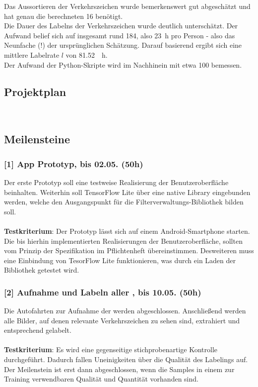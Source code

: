 Das Aussortieren der Verkehrszeichen wurde bemerkenswert gut abgeschätzt und hat genau die berechneten \SI{16}{\PS} benötigt.\\

Die Dauer des Labelns der Verkehrszeichen wurde deutlich unterschätzt. Der Aufwand belief sich auf insgesamt rund \SI{184}{\PS}, also \SI{23}{\hour} pro Person - also das Neunfache (!) der ursprünglichen Schätzung. Darauf basierend ergibt sich eine mittlere Labelrate $l$ von \SI{81.52}{\per\hour}.\\

Der Aufwand der Python-Skripte wird im Nachhinein mit etwa \SI{100}{\PS} bemessen.\\

\subsection{Projektplan}
\label{subsec:projektplan}

\\

\subsection{Meilensteine}
\label{subsec:meilensteine}
\subsubsection{[1] \gls{App} Prototyp, bis 02.05. (50h)}
Der erste Prototyp soll eine testweise Realisierung der Benutzeroberfläche beinhalten. Weiterhin soll \gls{TensorFlow Lite} über eine native Library eingebunden werden, welche den Ausgangspunkt für die \gls{Filterverwaltungs-Bibliothek}  bilden soll.\\
\\
\textbf{Testkriterium}: Der Prototyp lässt sich auf einem Android-Smartphone starten. Die bis hierhin implementierten Realisierungen der Benutzeroberfläche, sollten vom Prinzip der Spezifikation im Pflichtenheft übereinstimmen. Desweiteren muss eine Einbindung von TesorFlow Lite funktionieren, was durch ein Laden der Bibliothek getestet wird.\\

\subsubsection{[2] Aufnahme und Labeln aller , bis 10.05. (50h)}
Die Autofahrten zur Aufnahme der  werden abgeschlossen. Anschließend werden alle Bilder, auf denen relevante Verkehrszeichen zu sehen sind, extrahiert und entsprechend gelabelt.\\
\\
\textbf{Testkriterium}: Es wird eine gegenseitige stichprobenartige Kontrolle durchgeführt. Dadurch fallen Uneinigkeiten über die Qualität des Labelings auf. Der Meilenstein ist erst dann abgeschlossen, wenn die Samples in einem zur Training verwendbaren Qualität und Quantität vorhanden sind.\\ 

